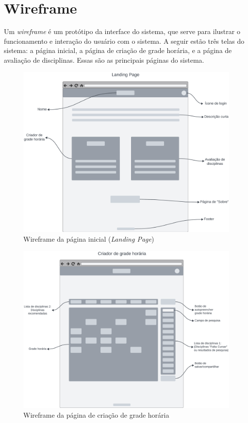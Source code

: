 \chapter{Wireframe}
\label{cha:Wireframe}

Um \textit{wireframe} é um protótipo da interface do sistema, que serve para ilustrar o funcionamento e interação do usuário com o sistema. A seguir estão três telas do sistema: a página inicial, a página de criação de grade horária, e a página de avaliação de disciplinas. Essas são as principais páginas do sistema.

\begin{figure}[ht]
    \begin{center}
    \includegraphics[width=390pt]{figuras/pagina-inicial.png}
    \caption{Wireframe da página inicial (\textit{Landing Page})}
    \label{fig:wireframe-pagina-inicial}
    \end{center}
\end{figure}

\begin{figure}[ht]
    \begin{center}
    \includegraphics[width=390pt]{figuras/pagina-criacao.png}
    \caption{Wireframe da página de criação de grade horária}
    \label{fig:wireframe-pagina-criacao}
    \end{center}
\end{figure}

